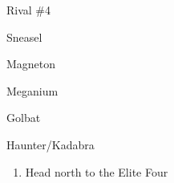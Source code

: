 \begin{paracol}{2}
\begin{boss}{Rival \#4}
	\varwb
	\begin{fightSection}{Sneasel}
		\item \xSpecial
		\item {} \return
	\end{fightSection}
	\begin{fightSection}{Magneton}
		\item {} \surf
	\end{fightSection}
	\begin{fightSection}{Meganium}
		\item {} \icePunch
	\end{fightSection}
	\begin{fightSection}{Golbat}
		\item {} \surf
	\end{fightSection}
	\begin{fightSection}{Haunter/Kadabra}
		\item {} \icePunch{} 
	\end{fightSection}
	\varwe
\end{boss}

\begin{enumerate}[resume]
	\item Head north to the Elite Four
\end{enumerate}

\end{paracol}
\vspace{3.5mm}